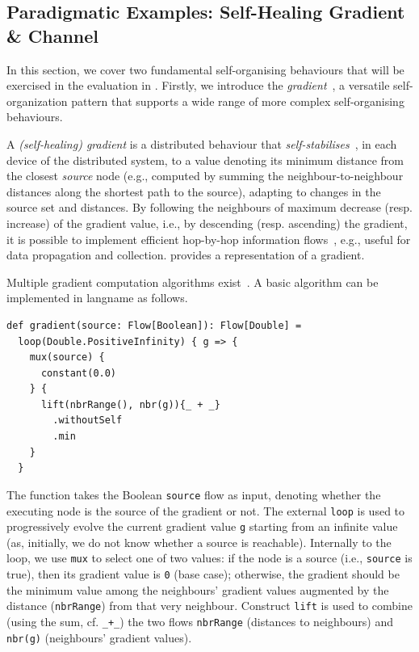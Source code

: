 \subsection{Paradigmatic Examples: Self-Healing Gradient \& Channel}
\label{acsos2023-frp:paradigmatic-examples}

In this section, we cover two fundamental self-organising behaviours
that will be exercised in the evaluation in .
%
Firstly, we introduce the \emph{gradient}~\cite{DBLP:conf/ipsn/NagpalSB03,audrito2017ULT}, a versatile
 self-organization pattern
 that supports a wide range of more complex self-organising behaviours.
%

\begin{example}\label{acsos2023-frp:ex:g}
%
A \emph{(self-healing) gradient} is a distributed behaviour 
 that \emph{self-stabilises}~\cite{dolev}, in each device  of the distributed system, 
 to a value denoting its minimum distance
 from the closest \emph{source} node (e.g., computed by summing the neighbour-to-neighbour distances along the shortest path to the source),
 adapting to changes in the source set and distances.
%
By following the neighbours of maximum decrease (resp. increase) of the gradient value, i.e., by descending (resp. ascending) the gradient,
 it is possible to implement efficient hop-by-hop information flows~\cite{DBLP:conf/saso/WolfH07},  e.g., useful for data propagation and collection.
%
%
%
 provides a representation of a gradient.
 
Multiple gradient computation algorithms exist~\cite{audrito2017ULT}. A basic algorithm can be implemented in \ac{langname} as follows.

\begin{lstlisting}
def gradient(source: Flow[Boolean]): Flow[Double] =
  loop(Double.PositiveInfinity) { g => {
    mux(source) {
      constant(0.0)
    } {
      lift(nbrRange(), nbr(g)){_ + _}
        .withoutSelf
        .min
    }
  }
\end{lstlisting}
%
The function takes the Boolean \lstinline|source| flow as input, denoting whether the executing node is the source of the gradient or not.
%
The external \lstinline|loop| is used to progressively evolve the current gradient value \lstinline|g|
starting from an infinite value
(as, initially, we do not know whether a source is reachable).
%
Internally to the loop,
  we use \lstinline|mux| to select one of two values:
  if the node is a source (i.e., \lstinline|source| is true), then its gradient value is \lstinline|0| (base case);
  otherwise, the gradient should be the minimum value among the neighbours' gradient values augmented by the distance (\lstinline|nbrRange|) from that very neighbour.
%
Construct \lstinline|lift| is used to combine (using the sum, cf. \lstinline|_+_|) the two flows \lstinline|nbrRange| (distances to neighbours) and \lstinline|nbr(g)| (neighbours' gradient values).

\end{example}

